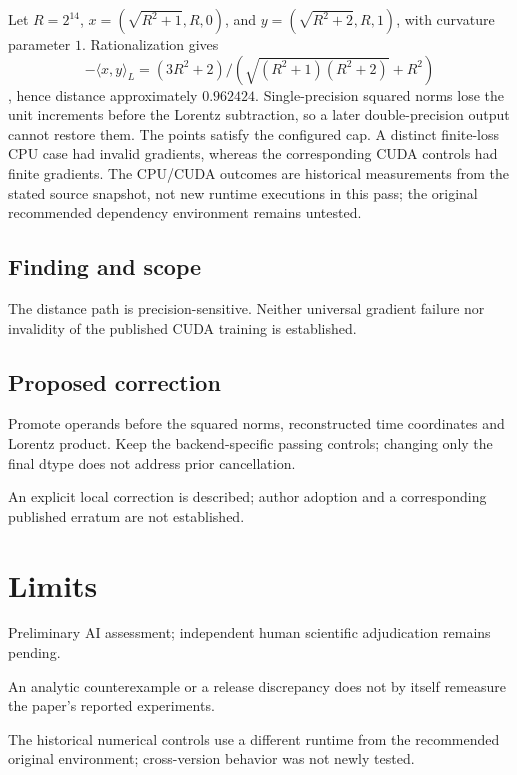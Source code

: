 \documentclass[11pt]{article}
\begin{document}
Let \(R=2^{14}\), \(x=(\sqrt{R^2+1},R,0)\), and \(y=(\sqrt{R^2+2},R,1)\), with curvature parameter \(1\). Rationalization gives \[-\langle x,y\rangle_L=(3R^2+2)/(\sqrt{(R^2+1)(R^2+2)}+R^2)\], hence distance approximately \(0.962424\). Single-precision squared norms lose the unit increments before the Lorentz subtraction, so a later double-precision output cannot restore them. The points satisfy the configured cap. A distinct finite-loss CPU case had invalid gradients, whereas the corresponding CUDA controls had finite gradients. The CPU/CUDA outcomes are historical measurements from the stated source snapshot, not new runtime executions in this pass; the original recommended dependency environment remains untested.

\subsection*{Finding and scope}

The distance path is precision-sensitive. Neither universal gradient failure nor invalidity of the published CUDA training is established.

\subsection*{Proposed correction}

Promote operands before the squared norms, reconstructed time coordinates and Lorentz product. Keep the backend-specific passing controls; changing only the final dtype does not address prior cancellation.

An explicit local correction is described; author adoption and a corresponding published erratum are not established.

\section*{Limits}

Preliminary AI assessment; independent human scientific adjudication remains pending.\par

An analytic counterexample or a release discrepancy does not by itself remeasure the paper’s reported experiments.\par

The historical numerical controls use a different runtime from the recommended original environment; cross-version behavior was not newly tested.\par
\end{document}
